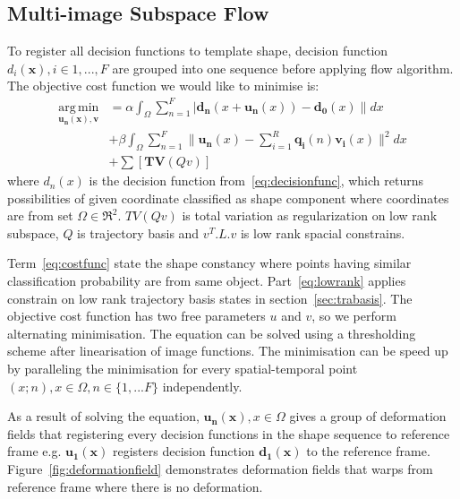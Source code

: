\subsection{Multi-image Subspace Flow}
To register all decision functions to template shape, decision function $d_i(\bm{x}), i \in {1,...,F}$ are grouped into one sequence before applying flow algorithm. The objective cost function we would like to minimise is:
\begin{align}
    \operatorname*{arg\,min}_{\bm{u_n}(\bm{x}), \bm{v}}&=\alpha \int_{\Omega}\sum_{n=1}^F|\bm{d_n}(x+\bm{u_n}(x))-\bm{d_0}(x)\| dx  \label{eq:costfunc}\\
    &+ \beta \int_{\Omega}\sum_{n=1}^F\|\bm{u_n}(x)-\sum_{i=1}^R\bm{q_i}(n)\bm{v_i}(x)\|^2 dx \label{eq:lowrank}\\
    &+ \sum[\bm{TV}(Qv)]
\end{align}
where $d_n(x)$ is the decision function from~\eqref{eq:decisionfunc}, which returns possibilities of given coordinate classified as shape component where coordinates are from set $\Omega \in \Re^2$. $TV(Qv)$ is total variation as regularization on low rank subspace, $Q$ is trajectory basis and $v^T.L.v$ is low rank spacial constrains.

Term~\eqref{eq:costfunc} state the shape constancy where points having similar classification probability are from same object.
Part~\eqref{eq:lowrank} applies constrain on low rank trajectory basis states in section~\ref{sec:trabasis}.
The objective cost function has two free parameters $u$ and $v$, so we perform alternating minimisation. The equation can be solved using a thresholding scheme after linearisation of image functions. The minimisation can be speed up by paralleling the minimisation for every spatial-temporal point $(x;n), x \in \Omega, n \in \{1,...F\}$ independently.

As a result of solving the equation, $\bm{u_n}(\bm{x}), x \in \Omega$ gives a group of deformation fields that registering every decision functions in the shape sequence to reference frame e.g. $\bm{u_1}(\bm{x})$ registers decision function $\bm{d_1}(\bm{x})$ to the reference frame. Figure~\ref{fig:deformationfield} demonstrates deformation fields that warps from reference frame where there is no deformation.

